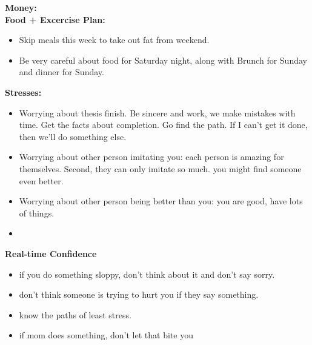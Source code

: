\documentclass[11pt]{article}
\begin{document}
{            \textbf{Money:}\\ 


            \textbf{Food + Excercise Plan:}\\
            \begin{itemize}
              \tiny \item \tiny Skip meals this week to take out fat from weekend.
            \item \tiny Be very careful about food for Saturday night, along with Brunch for Sunday and dinner for Sunday.
            \end{itemize}
            \textbf{Stresses:}\\
            \begin{itemize}
              \tiny \item \tiny Worrying about thesis finish. Be sincere and work, we
              make mistakes with time. Get the facts about completion. Go
              find the path. If I can't get it done, then we'll do something
              else.
            \item \tiny Worrying about other person imitating you: each person is amazing for themselves. Second, they can only imitate so much. you might find someone even better. 
            \item \tiny Worrying about other person being better than you: you are good, have lots of things.  
            \item \tiny 
              
            \end{itemize}
            
            \textbf{Real-time Confidence}\\
            \begin{itemize}
              \tiny \item \tiny if you do something sloppy, don't think about it and don't say sorry.
            \item \tiny don't think someone is trying to hurt you if they say something.
            \item \tiny know the paths of least stress.
            \item \tiny if mom does something, don't let that bite you
            \end{itemize}

}
\end{document}
